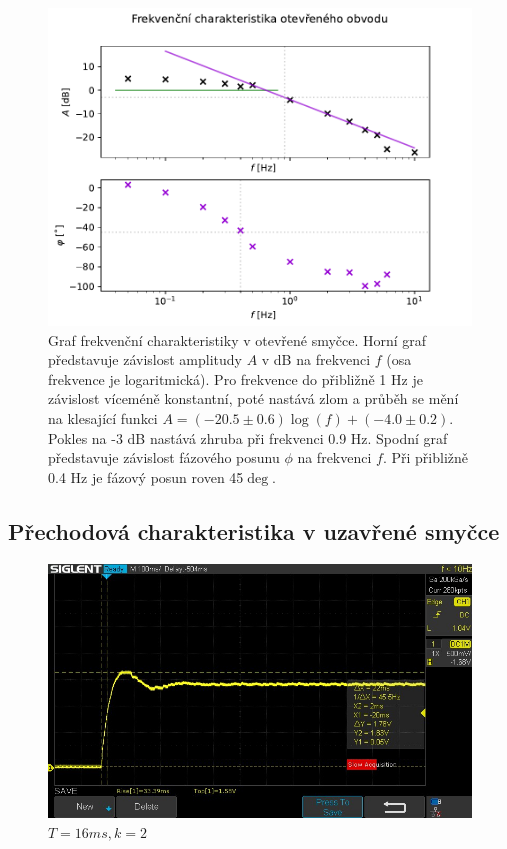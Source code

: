 		\begin{figure}[!hbt] 
			\centering
			\includegraphics[]{img/graf_bode_otevrena.pdf} 
			\caption{Graf frekvenční charakteristiky v otevřené smyčce. Horní graf představuje závislost amplitudy $A$ v dB na frekvenci $f$ (osa frekvence je logaritmická). Pro frekvence do přibližně 1 Hz je závislost víceméně konstantní, poté nastává zlom a průběh se mění na klesající funkci $A=(-20.5\pm 0.6)\log(f)+(-4.0\pm 0.2)$. Pokles na -3 dB nastává zhruba při frekvenci 0.9 Hz. Spodní graf představuje závislost fázového posunu $\phi$ na frekvenci $f$. Při přibližně 0.4 Hz je fázový posun roven 45$\deg$.} 
			\label{fig:bode_otevrena}
		\end{figure}


	\subsection{Přechodová charakteristika v uzavřené smyčce}
		\begin{figure}[!hbt] 
			\centering
			\includegraphics[scale=0.6]{img/SDS00001.jpg} 
			\caption{$T=16\unit{ms}, k=2$} 
			\label{fig:prechodova_uzavrena_k2}
		\end{figure}

